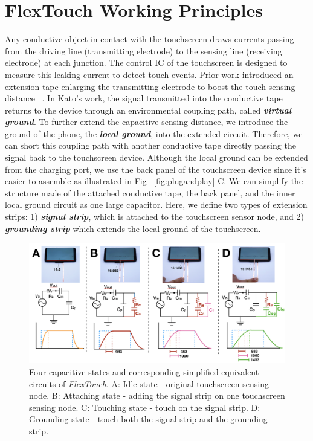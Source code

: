 \chapter{FlexTouch Working Principles}
\label{flextouch-working-principles}

Any conductive object in contact with the touchscreen draws currents passing from the driving line (transmitting electrode) to the sensing line (receiving electrode) at each junction. The control IC of the touchscreen is designed to measure this leaking current to detect touch events. Prior work introduced an extension tape enlarging the transmitting electrode to boost the touch sensing distance ~\cite{Kato2015, Kato2015a,mobicom-gao18, Ikematsu-Ohmic-Touch}. In Kato's work, the signal transmitted into the conductive tape returns to the device through an environmental coupling path, called \textbf{\textit{virtual ground}}. To further extend the capacitive sensing distance, we introduce the ground of the phone, the \textbf{\textit{local ground}}, into the extended circuit. Therefore, we can short this coupling path with another conductive tape directly passing the signal back to the touchscreen device. Although the local ground can be extended from the charging port, we use the back panel of the touchscreen device since it's easier to assemble as illustrated in Fig ~\ref{fig:plugandplay} C. We can simplify the structure made of the attached conductive tape, the back panel, and the inner local ground circuit as one large capacitor. Here, we define two types of extension strips: 1) \textbf{\textit{signal strip}}, which is attached to the touchscreen sensor node, and 2) \textbf{\textit{grounding strip}} which extends the local ground of the touchscreen.

\begin{figure}[ht]
\centering
    \includegraphics[width=0.75\columnwidth]{figures/principle_mode.png}
    \setlength{\belowcaptionskip}{-8pt}
    \caption{Four capacitive states and corresponding simplified equivalent circuits of \textit{FlexTouch}. A: Idle state - original touchscreen sensing node. B: Attaching state - adding the signal strip on one touchscreen sensing node. C: Touching state - touch on the signal strip. D: Grounding state - touch both the signal strip and the grounding strip.}
    \label{fig:mode}
\end{figure}

